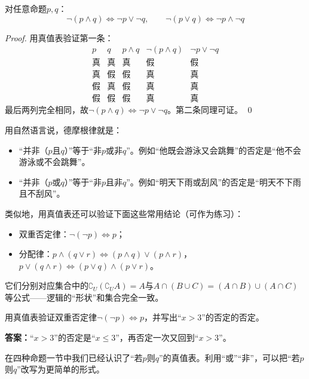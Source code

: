 \begin{theorem}[德摩根律]
对任意命题$p,q$：
\[\neg(p\land q)\iff\neg p\lor\neg q,\qquad \neg(p\lor q)\iff\neg p\land\neg q\]
\end{theorem}
\begin{proof}
用真值表验证第一条：
\[
\begin{array}{c|c||c|c|c}
p & q & p\land q & \neg(p\land q) & \neg p\lor\neg q\\\hline
\text{真} & \text{真} & \text{真} & \text{假} & \text{假}\\
\text{真} & \text{假} & \text{假} & \text{真} & \text{真}\\
\text{假} & \text{真} & \text{假} & \text{真} & \text{真}\\
\text{假} & \text{假} & \text{假} & \text{真} & \text{真}
\end{array}
\]
最后两列完全相同，故$\neg(p\land q)\iff\neg p\lor\neg q$。第二条同理可证。
\qed
\end{proof}

用自然语言说，德摩根律就是：
\begin{itemize}
    \item “并非（$p$且$q$）”等于“非$p$或非$q$”。例如“他既会游泳又会跳舞”的否定是“他不会游泳或不会跳舞”。
    \item “并非（$p$或$q$）”等于“非$p$且非$q$”。例如“明天下雨或刮风”的否定是“明天不下雨且不刮风”。
\end{itemize}

类似地，用真值表还可以验证下面这些常用结论（可作为练习）：
\begin{itemize}
    \item 双重否定律：$\neg(\neg p)\iff p$；
    \item 分配律：$p\land(q\lor r)\iff(p\land q)\lor(p\land r)$，$p\lor(q\land r)\iff(p\lor q)\land(p\lor r)$。
\end{itemize}
它们分别对应集合中的$\complement_{U}(\complement_{U}A)=A$与$A\cap(B\cup C)=(A\cap B)\cup(A\cap C)$等公式——逻辑的“形状”和集合完全一致。

\begin{exercise}
用真值表验证双重否定律$\neg(\neg p)\iff p$，并写出“$x>3$”的否定的否定。
\end{exercise}
\textbf{答案：}“$x>3$”的否定是“$x\leq 3$”，再否定一次又回到“$x>3$”。

在四种命题一节中我们已经认识了“若$p$则$q$”的真值表。利用“或”“非”，可以把“若$p$则$q$”改写为更简单的形式。


